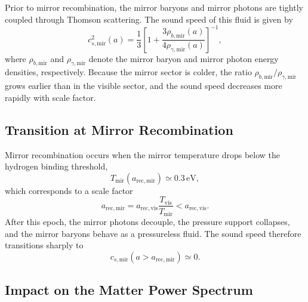\documentclass[11pt,a4paper]{article}
\begin{document}
Prior to mirror recombination, the mirror baryons and mirror photons are
tightly coupled through Thomson scattering. The sound speed of this fluid is
given by
\begin{equation}
c_{s,\mathrm{mir}}^{2}(a)
    = \frac{1}{3}
      \left[
        1 + \frac{3\rho_{b,\mathrm{mir}}(a)}{4\rho_{\gamma,\mathrm{mir}}(a)}
      \right]^{-1},
\end{equation}
where $\rho_{b,\mathrm{mir}}$ and $\rho_{\gamma,\mathrm{mir}}$ denote the mirror
baryon and mirror photon energy densities, respectively. Because the mirror
sector is colder, the ratio $\rho_{b,\mathrm{mir}}/\rho_{\gamma,\mathrm{mir}}$
grows earlier than in the visible sector, and the sound speed decreases more
rapidly with scale factor.




\subsection{Transition at Mirror Recombination}

Mirror recombination occurs when the mirror temperature drops below the
hydrogen binding threshold,
\begin{equation}
T_{\mathrm{mir}}(a_{\mathrm{rec,mir}}) \simeq 0.3\,\mathrm{eV},
\end{equation}
which corresponds to a scale factor
\begin{equation}
a_{\mathrm{rec,mir}}
    = a_{\mathrm{rec,vis}}
      \frac{T_{\mathrm{vis}}}{T_{\mathrm{mir}}}
    < a_{\mathrm{rec,vis}}.
\end{equation}
After this epoch, the mirror photons decouple, the pressure support collapses,
and the mirror baryons behave as a pressureless fluid. The sound speed
therefore transitions sharply to
\begin{equation}
c_{s,\mathrm{mir}}(a > a_{\mathrm{rec,mir}}) \simeq 0.
\end{equation}




\subsection{Impact on the Matter Power Spectrum}
\end{document}
